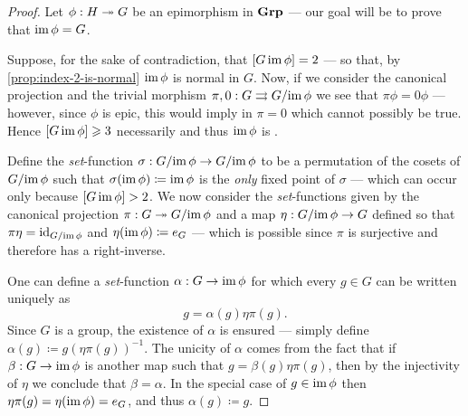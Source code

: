\begin{proof}
Let \(\phi: H \twoheadrightarrow G\) be an epimorphism in \({\textbf{Grp}}\) --- our goal will be to
prove that \(\operatorname{im} \phi = G\).

Suppose, for the sake of contradiction, that \([G \relax \operatorname{im} \phi] = 2\) --- so
that, by \cref{prop:index-2-is-normal} \(\operatorname{im} \phi\) is normal in \(G\). Now, if
we consider the canonical projection and the trivial morphism
\(\pi, 0: G \rightrightarrows G/{\operatorname{im} \phi}\) we see that \(\pi \phi = 0 \phi\)
--- however, since \(\phi\) is epic, this would imply in \(\pi = 0\) which
cannot possibly be true. Hence \([G \relax \operatorname{im} \phi] \geqslant 3\) necessarily and
thus \(\operatorname{im} \phi\) is .

Define the \emph{set}-function \(\sigma: G/{\operatorname{im} \phi} \to G/{\operatorname{im} \phi}\) to be a
permutation of the cosets of \(G/{\operatorname{im} \phi}\) such that
\(\sigma(\operatorname{im} \phi) \coloneq \operatorname{im} \phi\) is the \emph{only} fixed point of
\(\sigma\) --- which can occur only because \([G \relax \operatorname{im} \phi] > 2\). We now
consider the \emph{set}-functions given by the canonical projection
\(\pi: G \twoheadrightarrow G/{\operatorname{im} \phi}\) and a map \(\eta: G/{\operatorname{im} \phi} \to G\) defined so
that \(\pi \eta = \operatorname{id}_{G/{\operatorname{im} \phi}}\) and \(\eta(\operatorname{im} \phi) \coloneq e_G\) ---
which is possible since \(\pi\) is surjective and therefore has a right-inverse.

One can define a \emph{set}-function \(\alpha: G \to \operatorname{im} \phi\) for which every
\(g \in G\) can be written uniquely as
\begin{equation}\label{eq:write-uniquely-g}
  g = \alpha(g) \eta \pi(g).
\end{equation}
Since \(G\) is a group, the existence of \(\alpha\) is ensured --- simply define
\(\alpha(g) \coloneq g (\eta \pi(g))^{-1}\).  The unicity of \(\alpha\) comes
from the fact that if \(\beta: G \to \operatorname{im} \phi\) is another map such that
\(g = \beta(g) \eta \pi(g)\), then by the injectivity of \(\eta\) we conclude
that \(\beta = \alpha\). In the special case of \(g \in \operatorname{im} \phi\) then
\(\eta\pi(g) = \eta(\operatorname{im} \phi) = e_G\), and thus \(\alpha(g) \coloneq g\).


\end{proof}
